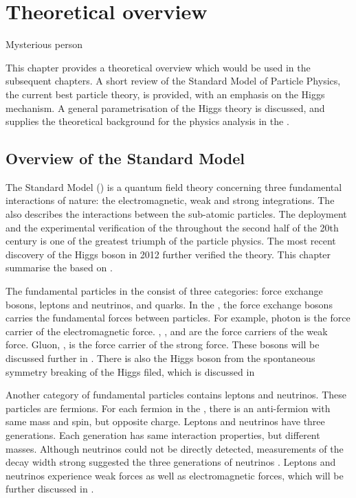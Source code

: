 \chapter{Theoretical overview}
\label{chap:Theory}

%
{Mysterious person}%

This chapter provides a theoretical overview which would be used in the subsequent  chapters. A short review of the Standard Model of Particle Physics, the current best particle theory, is provided, with an emphasis on the Higgs mechanism. A general parametrisation of the Higgs theory is discussed, and supplies the theoretical background for the physics analysis in the .

\section{Overview of the Standard Model}

The Standard Model (\SM) is a quantum field theory concerning three fundamental interactions of nature: the electromagnetic, weak and strong integrations. The \SM also describes the interactions between the sub-atomic particles. The deployment and the experimental verification of the \SM throughout the second half of the 20th century is one of the greatest triumph of the particle physics. The most recent discovery of the Higgs boson in 2012 \cite{} further verified the theory. This chapter summarise the \SM based on \cite{}.

The fundamental particles in the \SM consist of three categories: force exchange bosons, leptons and neutrinos, and quarks. In the \SM, the force exchange bosons carries the fundamental forces between particles. For example, photon is the force carrier of the electromagnetic force. \PWp, \PWm, and \PZ are the force carriers of the weak force. Gluon, \Pg, is the force carrier of the strong force. These bosons will be discussed further in \Section{}. There is also the Higgs boson from the spontaneous symmetry breaking of the Higgs filed, which is discussed in \Section{}


Another category of fundamental particles contains leptons and neutrinos. These particles are fermions. For each fermion in the \SM, there is an anti-fermion with same mass and spin, but opposite charge. Leptons and neutrinos have three generations. Each generation has same interaction properties, but different masses. Although neutrinos could not be directly detected, measurements of the \PZ decay width strong suggested the three generations of neutrinos \cite{ALEPH:2005ab}. Leptons and neutrinos experience weak forces as well as electromagnetic forces, which will be further discussed in \Section{}.

